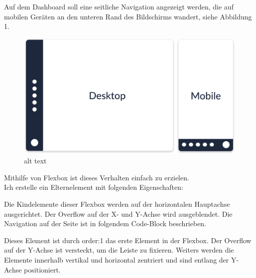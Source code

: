 Auf dem Dashboard soll eine seitliche Navigation angezeigt werden, die
auf mobilen Geräten an den unteren Rand des Bildschirms wandert, siehe
Abbildung 1.

\begin{figure}
\centering
\includegraphics{bilder/Dominik/Flexbox_Illustration_1.png}
\caption{alt text}
\end{figure}

Mithilfe von Flexbox ist dieses Verhalten einfach zu erzielen.\\
Ich erstelle ein Elternelement mit folgenden Eigenschaften:

\begin{Shaded}
\begin{Highlighting}[]
\NormalTok{\{}
  \NormalTok{: }\NormalTok{;}
\NormalTok{\}}
\end{Highlighting}
\end{Shaded}

Die Kindelemente dieser Flexbox werden auf der horizontalen Hauptachse
ausgerichtet. Der Overflow auf der X- und Y-Achse wird ausgeblendet. Die
Navigation auf der Seite ist in folgendem Code-Block beschrieben.

Dieses Element ist durch order:1 das erste Element in der Flexbox. Der
Overflow auf der Y-Achse ist versteckt, um die Leiste zu fixieren.
Weiters werden die Elemente innerhalb vertikal und horizontal zentriert
und sind entlang der Y-Achse positioniert.

\begin{Shaded}
\begin{Highlighting}[]
\NormalTok{\{}
  \NormalTok{: }\NormalTok{;}
  \NormalTok{: }\NormalTok{;}
  \NormalTok{: }\NormalTok{;}
\NormalTok{\}}
\end{Highlighting}
\end{Shaded}

